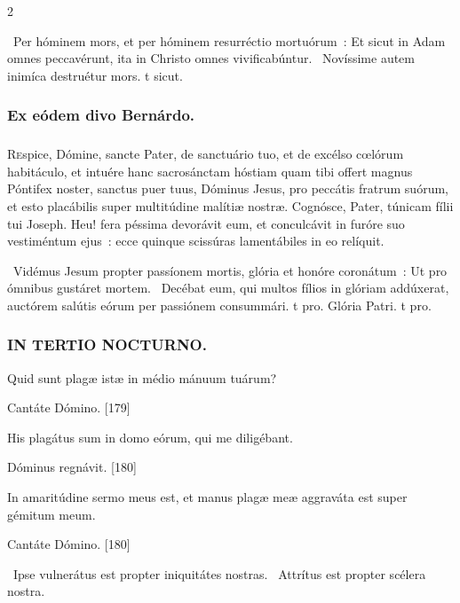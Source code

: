 \documentclass[9pt,twoside]{extarticle}
\begin{document}
\begin{multicols}{2}
\begin{tightlist}{}
\item {}~Per hóminem mors, et per hóminem resurréctio mortuórum~: \textred{*} Et sicut in Adam omnes peccavérunt, ita in Christo omnes vivificabúntur. ~Novíssime autem inimíca destruétur mors. t sicut.
\end{tightlist}

\subsubsection*{\center Ex eódem divo Bernárdo.}
\subsubsection*{\center {}}
\lettrine{R}espice, Dómine, sancte Pater, de sanctuário tuo, et de excélso cœlórum habitáculo, et intuére hanc sacrosánctam hóstiam quam tibi offert magnus Póntifex noster, sanctus puer tuus, Dóminus Jesus, pro peccátis fratrum suórum, et esto placábilis super multitúdine malítiæ nostræ. Cognósce, Pater, túnicam fílii tui Joseph. Heu! fera péssima devorávit eum, et conculcávit in furóre suo vestiméntum ejus~: ecce quinque scissúras lamentábiles in eo relíquit.

\begin{tightlist}{}
\item {}~Vidémus Jesum propter passíonem mortis, glória et honóre coronátum~: \textred{*} Ut pro ómnibus gustáret mortem. ~Decébat eum, qui multos fílios in glóriam addúxerat, auctórem salútis eórum per passiónem consummári. t pro. Glória Patri. t pro.
\end{tightlist}

\subsubsection*{\center \textsc{IN TERTIO NOCTURNO.}}
\begin{tightlist}{}
\item {} Quid sunt plagæ istæ in médio mánuum tuárum?
\item {} Cantáte Dómino. [179]
\item {} His plagátus sum in domo eórum, qui me diligébant.
\item {} Dóminus regnávit. [180]
\item {} In amaritúdine sermo meus est, et manus plagæ meæ aggraváta est super gémitum meum.
\item {} Cantáte Dómino. [180]
\item {}~Ipse vulnerátus est propter iniquitátes nostras. ~Attrítus est propter scélera nostra.
\end{tightlist}


\end{multicols}
\end{document}
